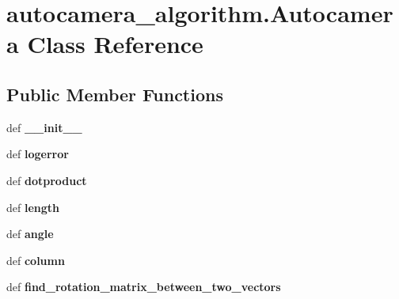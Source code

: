 \hypertarget{classautocamera__algorithm_1_1Autocamera}{\section{autocamera\-\_\-algorithm.\-Autocamera Class Reference}
\label{classautocamera__algorithm_1_1Autocamera}
}
\subsection*{Public Member Functions}
\begin{DoxyCompactItemize}
\item 
\hypertarget{classautocamera__algorithm_1_1Autocamera_a88d53452675d2b51c312bd76c5a46dfb}{def {\bfseries \-\_\-\-\_\-init\-\_\-\-\_\-}}\label{classautocamera__algorithm_1_1Autocamera_a88d53452675d2b51c312bd76c5a46dfb}

\item 
\hypertarget{classautocamera__algorithm_1_1Autocamera_a107fbd8731769063038b861fe06cd904}{def {\bfseries logerror}}\label{classautocamera__algorithm_1_1Autocamera_a107fbd8731769063038b861fe06cd904}

\item 
\hypertarget{classautocamera__algorithm_1_1Autocamera_a741362e4cf80c27b87f2f74e1f9da4ef}{def {\bfseries dotproduct}}\label{classautocamera__algorithm_1_1Autocamera_a741362e4cf80c27b87f2f74e1f9da4ef}

\item 
\hypertarget{classautocamera__algorithm_1_1Autocamera_af90f7c97b8863d2bbdac99f88b7cb3b8}{def {\bfseries length}}\label{classautocamera__algorithm_1_1Autocamera_af90f7c97b8863d2bbdac99f88b7cb3b8}

\item 
\hypertarget{classautocamera__algorithm_1_1Autocamera_abeb1602619307de1f9b7b37503fd90d3}{def {\bfseries angle}}\label{classautocamera__algorithm_1_1Autocamera_abeb1602619307de1f9b7b37503fd90d3}

\item 
\hypertarget{classautocamera__algorithm_1_1Autocamera_a989fda868dbc2caa0fc3b48c787c2484}{def {\bfseries column}}\label{classautocamera__algorithm_1_1Autocamera_a989fda868dbc2caa0fc3b48c787c2484}

\item 
\hypertarget{classautocamera__algorithm_1_1Autocamera_a7170368dd1031e799f4eacb3fb859d30}{def {\bfseries find\-\_\-rotation\-\_\-matrix\-\_\-between\-\_\-two\-\_\-vectors}}\label{classautocamera__algorithm_1_1Autocamera_a7170368dd1031e799f4eacb3fb859d30}


\end{DoxyCompactItemize}
